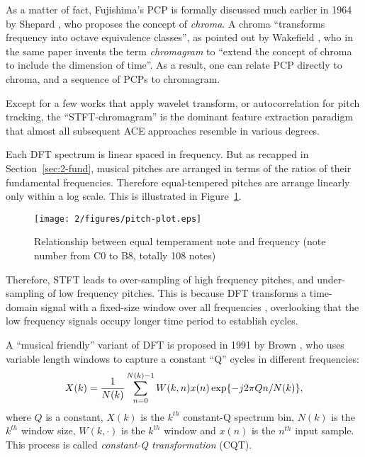As a matter of fact, Fujishima's PCP is formally discussed much earlier in 1964 by Shepard \cite{shepard1964circularity}, who proposes the concept of {\it chroma}. A chroma ``transforms frequency into octave equivalence classes'', as pointed out by Wakefield \cite{wakefield1999mathematical}, who in the same paper invents the term {\it chromagram} to ``extend the concept of chroma to include the dimension of time''. As a result, one can relate PCP directly to chroma, and a sequence of PCPs to chromagram.

Except for a few works that apply wavelet \cite{su2001multi} transform, or autocorrelation \cite{bello2000techniques,zenz2007automatic} for pitch tracking, the ``STFT-chromagram'' is the dominant feature extraction paradigm that almost all subsequent ACE approaches resemble in various degrees.

Each DFT spectrum is linear spaced in frequency. But as recapped in Section~\ref{sec:2-fund}, musical pitches are arranged in terms of the ratios of their fundamental frequencies. Therefore equal-tempered pitches are arrange linearly only within a log scale. This is illustrated in Figure~\ref{fig:2-pitchplot}.
\begin{figure}[htb]
\centering
\texttt{[image: 2/figures/pitch-plot.eps]}
\caption{Relationship between equal temperament note and frequency (note number from C0 to B8, totally 108 notes)}
\label{fig:2-pitchplot}
\end{figure}
Therefore, STFT leads to over-sampling of high frequency pitches, and under-sampling of low frequency pitches. This is because DFT transforms a time-domain signal with a fixed-size window over all frequencies \cite{oppenheim1983signals}, overlooking that the low frequency signals occupy longer time period to establish cycles.

A ``musical friendly'' variant of DFT is proposed in 1991 by Brown \cite{brown1991calculation}, who uses variable length windows to capture a constant ``Q'' cycles in different frequencies:
\begin{equation}
X(k) = {1\over {N(k)}} \sum_{n=0}^{N(k)-1}{W(k,n)x(n)\exp\{-j2\pi Qn/N(k)\}},
\end{equation}
where $Q$ is a constant, $X(k)$ is the $k^{th}$ constant-Q spectrum bin, $N(k)$ is the $k^{th}$ window size, $W(k,\cdot)$ is the $k^{th}$ window and $x(n)$ is the $n^{th}$ input sample. This process is called \textit{constant-Q transformation} (CQT).

